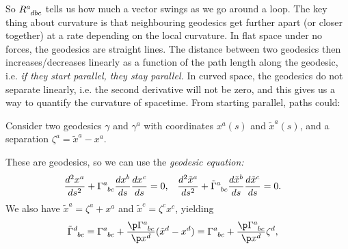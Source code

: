 \documentclass[a4paper, 11pt, normalem]{report}
\begin{document}
So $\tensor{R}{^a_{dbc}}$ tells us how much a vector swings as we go around a loop. 
The key thing about curvature is that neighbouring geodesics get further apart (or closer together) at a rate depending on the local curvature.
In flat space under no forces, the geodesics are straight lines. 
The distance between two geodesics then increases/decreases linearly as a function of the path length along the geodesic, i.e. \emph{if they start parallel, they stay parallel.}
In curved space, the geodesics do not separate linearly, i.e. the second derivative will not be zero, and this gives us a way to quantify the curvature of spacetime. 
From starting parallel, paths could:
\begin{figure}[H]
    \centering
\end{figure}
Consider two geodesics $\gamma$ and $\gamma^a$ with coordinates $x^a(s)$ and $\tilde{x}^a(s)$, and a separation $\zeta^a=\tilde{x}^a - x^a$.
\begin{figure}[H]
    \centering
\end{figure}
These are geodesics, so we can use the \emph{geodesic equation:}
\begin{align}
    \frac{d^2x^a}{ds^2} &+ \tensor{\Gamma}{^a_{bc}}\frac{dx^b}{ds} \frac{dx^c}{ds} = 0, & \frac{d^2\tilde{x}^a}{ds^2} &+ \tensor{\tilde{\Gamma}}{^a_{bc}}\frac{d\tilde{x}^b}{ds}\frac{d\tilde{x}^c}{ds} = 0.
\end{align}
We also have $\tilde{x}^a=\zeta^a + x^a$ and $\tilde{x}^c = \zeta^c x^c$, yielding
\begin{align}
    \tensor{\tilde{\Gamma}}{^d_{bc}} &= \tensor{\Gamma}{^a_{bc}}+\frac{\p\tensor{\Gamma}{^a_{bc}}}{\p x^d}(\tilde{x}^d-x^d) = \tensor{\Gamma}{^a_{bc}} + \frac{\p\tensor{\Gamma}{^a_{bc}}}{\p x^d}\zeta^d,
\end{align}
\end{document}
